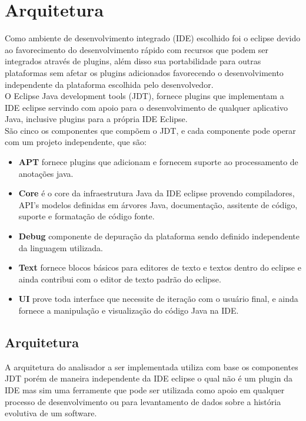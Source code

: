 \chapter {Arquitetura}

Como ambiente de desenvolvimento integrado (IDE) escolhido foi o eclipse devido ao favorecimento do desenvolvimento rápido com recursos que podem ser integrados através de plugins, além disso sua portabilidade para outras plataformas sem afetar os plugins adicionados favorecendo o desenvolvimento independente da plataforma escolhida pelo desenvolvedor.\\

O Eclipse Java development tools (JDT), fornece plugins que implementam a IDE eclipse servindo com apoio para o desenvolvimento de qualquer aplicativo Java, inclusive plugins para a própria IDE Eclipse.\\

São cinco os componentes que compõem o JDT, e cada componente pode operar com um projeto independente, que são:

	\begin{itemize}
		\item \textbf{APT} fornece plugins que adicionam e fornecem suporte ao processamento de anotações java.
		\item \textbf{Core} é o core da infraestrutura Java da IDE eclipse provendo compiladores, API's modelos definidas em árvores Java, documentação, assitente de código, suporte e formatação de código fonte.
		\item \textbf{Debug} componente de depuração da plataforma sendo definido independente da linguagem utilizada.
		\item \textbf{Text} fornece blocos básicos para editores de texto e textos dentro do eclipse e ainda contribui com o editor de texto padrão do eclipse. \item \textbf{UI} prove toda interface que necessite de iteração com o usuário final, e ainda fornece a manipulação e visualização do código Java na IDE.
	\end{itemize} 
	
\section {Arquitetura}

A arquitetura do analisador a ser implementada utiliza com base os componentes JDT porém de maneira independente da IDE eclipse o qual não é um plugin da IDE mas sim uma ferramente que pode ser utilizada como apoio em qualquer processo de desenvolvimento ou para levantamento de dados sobre a história evolutiva de um software.\\

